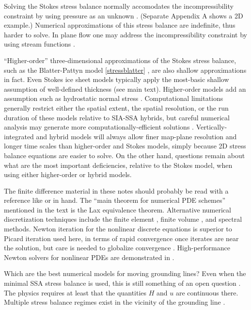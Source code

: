 \documentclass[letterpaper,final,12pt,reqno]{amsart}
\begin{document}
Solving the Stokes stress balance normally accomodates the incompressibility constraint by using pressure as an unknown \cite{Bueler2021,JouvetRappaz2011,Lengetal2012,ISMIPHOM}.  (Separate Appendix A shows a 2D example.)  Numerical approximations of this stress balance are indefinite, thus harder to solve.  In plane flow one may address the incompressibility constraint by using stream functions \cite{BaliseRaymond1985}.

``Higher-order'' three-dimensional approximations of the Stokes stress balance, such as the Blatter-Pattyn model \eqref{stressblatter} \cite{Blatter,Pattyn03,SchoofHindmarsh}, are also shallow approximations in fact.  Even Stokes ice sheet models typically apply the most-basic shallow assumption of well-defined thickness (see main text).  Higher-order models add an assumption such as hydrostatic normal stress \cite{GreveBlatter2009}.  Computational limitations generally restrict either the spatial extent, the spatial resolution, or the run duration of these models relative to SIA-SSA hybrids, but careful numerical analysis may generate more computationally-efficient solutions \cite{Brown2013}.  Vertically-integrated and hybrid models will always allow finer map-plane resolution and longer time scales than higher-order and Stokes models, simply because 2D stress balance equations are easier to solve.  On the other hand, questions remain about what are the most important deficiencies, relative to the Stokes model, when using either higher-order \cite{ISMIPHOM} or hybrid models.

The finite difference material in these notes should probably be read with a reference like \cite{LeVequeFD} or \cite{MortonMayers} in hand.  The ``main theorem for numerical PDE schemes'' mentioned in the text is the Lax equivalence theorem.  Alternative numerical discretization techniques include the finite element \cite{Braess}, finite volume \cite{LeVeque}, and spectral \cite{Trefethen} methods.  Newton iteration for the nonlinear discrete equations is superior to Picard iteration used here, in terms of rapid convergence once iterates are near the solution, but care is needed to globalize convergence \cite{Kelley}.  High-performance Newton solvers for nonlinear PDEs are demonstrated in \cite{Bueler2021}.

Which are the best numerical models for moving grounding lines?  Even when the minimal SSA stress balance is used, this is still something of an open question \cite{Feldmannetal2014,Goldbergetal2009,MISMIP3d2013,MISMIP2012,SchoofMarine1}.  The physics requires at least that the quantities $H$ and $u$ are continuous there.  Multiple stress balance regimes exist in the vicinity of the grounding line \cite{SchoofMarine2}.
\end{document}
